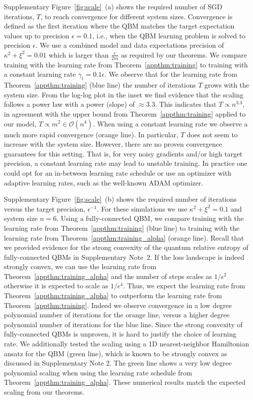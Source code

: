 \documentclass[
    reprint,
    aps,
    prx,
    longbibliography
]{revtex4-2}
\begin{document}
Supplementary Figure~\ref{fig:scale}~(a) shows the required number of SGD iterations, $T$, to reach convergence for different system sizes. Convergence is defined as the first iteration where the QBM matches the target expectation values up to precision $\epsilon=0.1$, i.e., when the QBM learning problem is solved to precision $\epsilon$. We use a combined model and data expectations precision of $\kappa^2+\xi^2=0.01$ which is larger than $\frac{\epsilon}{2m}$ as required by our theorems. We compare training with the learning rate from Theorem~\ref{appthm:training} to training with a constant learning rate $\gamma_t=0.1\epsilon$. We observe that for the learning rate from Theorem~\ref{appthm:training} (blue line) the number of iterations $T$ grows with the system size. From the log-log plot in the inset we find evidence that the scaling follows a power law with a power (slope) of $\approx3.3$. This indicates that $T\propto n^{3.3}$, in agreement with the upper bound from Theorem~\ref{appthm:training} applied to our model, $T \propto m^2 \in \mathcal{O}(n^4)$. When using a constant learning rate we observe a much more rapid convergence (orange line). In particular, $T$ does not seem to increase with the system size. However, there are no proven convergence guarantees for this setting. That is, for very noisy gradients and/or high target precision, a constant learning rate may lead to unstable training. In practice one could opt for an in-between learning rate schedule or use an optimizer with adaptive learning rates, such as the well-known ADAM optimizer. 

Supplementary Figure~\ref{fig:scale}~(b) shows the required number of iterations versus the target precision, $\epsilon^{-1}$. For these simulations we use $\kappa^2+\xi^2=0.1$ and system size $n=6$. Using a fully-connected QBM, we compare training with the learning rate from Theorem~\ref{appthm:training} (blue line) to training with the learning rate from Theorem~\ref{appthm:training_alpha} (orange line). Recall that we provided evidence for the strong convexity of the quantum relative entropy of fully-connected QBMs in Supplementary Note~2. 
If the loss landscape is indeed strongly convex, we can use the learning rate from Theorem~\ref{appthm:training_alpha} and the number of steps scales as $1/\epsilon^2$ otherwise it is expected to scale as $1/\epsilon^4$.
Thus, we expect the learning rate from Theorem~\ref{appthm:training_alpha} to outperform the learning rate from Theorem~\ref{appthm:training}. Indeed we observe convergence in a low degree polynomial number of iterations for the orange line, versus a higher degree polynomial number of iterations for the blue line. Since the strong convexity of fully-connected QBMs is unproven, it is hard to justify the choice of learning rate. We additionally tested the scaling using a 1D nearest-neighbor Hamiltonian ansatz for the QBM (green line), which is known to be strongly convex as discussed in Supplementary Note 2.
The green line shows a very low degree polynomial scaling when using the learning rate schedule from Theorem~\ref{appthm:training_alpha}. These numerical results match the expected scaling from our theorems. 
\end{document}
